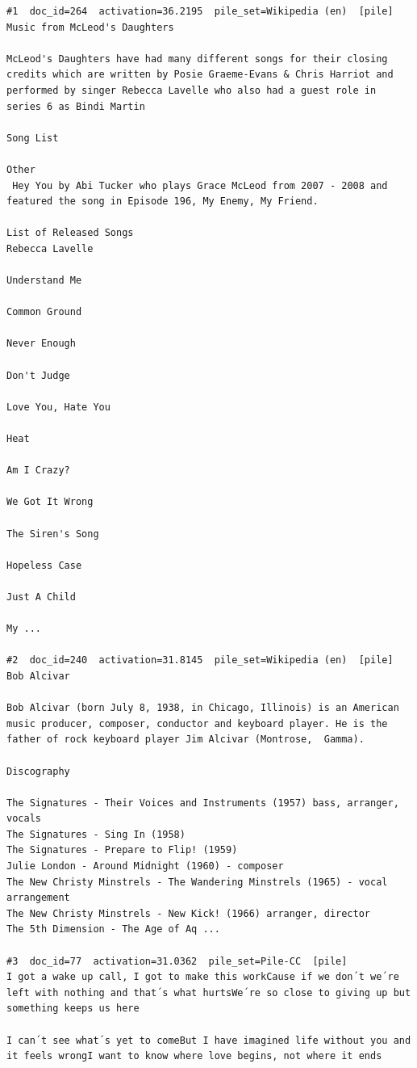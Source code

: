 \begin{verbatim}
#1  doc_id=264  activation=36.2195  pile_set=Wikipedia (en)  [pile]
Music from McLeod's Daughters

McLeod's Daughters have had many different songs for their closing credits which are written by Posie Graeme-Evans & Chris Harriot and performed by singer Rebecca Lavelle who also had a guest role in series 6 as Bindi Martin

Song List

Other
 Hey You by Abi Tucker who plays Grace McLeod from 2007 - 2008 and featured the song in Episode 196, My Enemy, My Friend.

List of Released Songs
Rebecca Lavelle

Understand Me 

Common Ground

Never Enough

Don't Judge

Love You, Hate You

Heat

Am I Crazy?

We Got It Wrong

The Siren's Song

Hopeless Case

Just A Child

My ...

#2  doc_id=240  activation=31.8145  pile_set=Wikipedia (en)  [pile]
Bob Alcivar

Bob Alcivar (born July 8, 1938, in Chicago, Illinois) is an American music producer, composer, conductor and keyboard player. He is the father of rock keyboard player Jim Alcivar (Montrose,  Gamma).

Discography

The Signatures - Their Voices and Instruments (1957) bass, arranger, vocals
The Signatures - Sing In (1958)
The Signatures - Prepare to Flip! (1959)
Julie London - Around Midnight (1960) - composer
The New Christy Minstrels - The Wandering Minstrels (1965) - vocal arrangement
The New Christy Minstrels - New Kick! (1966) arranger, director
The 5th Dimension - The Age of Aq ...

#3  doc_id=77  activation=31.0362  pile_set=Pile-CC  [pile]
I got a wake up call, I got to make this workCause if we don´t we´re left with nothing and that´s what hurtsWe´re so close to giving up but something keeps us here

I can´t see what´s yet to comeBut I have imagined life without you and it feels wrongI want to know where love begins, not where it ends


\end{verbatim}
